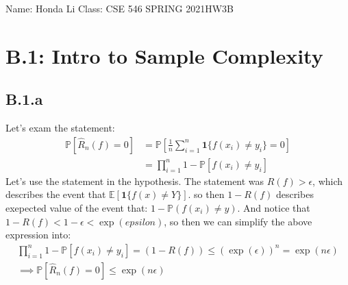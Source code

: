 \documentclass[]{article}
\begin{document}
\begin{center}
    Name: Honda Li \quad Class: CSE 546 SPRING 2021\quad HW3B 
\end{center}

\section*{B.1: Intro to Sample Complexity}
    \subsection*{B.1.a}
        Let's exam the statement: 
        \begin{align*}\tag{B.1.a}\label{eqn:B.1.a}
            \mathbb{P}\left[
                \hat{R}_n(f) = 0
            \right]
            &= 
            \mathbb{P}\left[
                \frac{1}{n}\sum_{i = 1}^{n}
                    \mathbf{1}\{
                        f(x_i) \ne y_i
                    \} = 0
            \right]
            \\
            &= 
            \prod_{i = 1}^{n}
                1 - \mathbb{P}\left[
                    f(x_i) \ne y_i
                \right]
        \end{align*}
    Let's use the statement in the hypothesis. The statement was $R(f) > \epsilon$, which describes the event that $\mathbb{E}\left[\mathbf{1}\{f(x)\ne Y\}\right]$. so then $1 - R(f)$ describes exepected value of the event that: $1 - \mathbb{P}\left(f(x_i) \ne y\right)$. And notice that $1 - R(f)< 1 - \epsilon < \exp(epsilon)$, so then we can simplify the above expression into: 
    \begin{align*}\tag{B.1.a.1}\label{eqn:B.1.a.1}
        \prod_{i = 1}^{n}
        1 - \mathbb{P}\left[
            f(x_i) \ne y_i
        \right] = (1 - R(f)) \le (\exp(\epsilon))^n = \exp(n\epsilon)
        \\
        \implies 
        \mathbb{P}\left[
            \hat{R}_n(f) = 0
        \right] \le \exp(n\epsilon)
    \end{align*}
\end{document}
